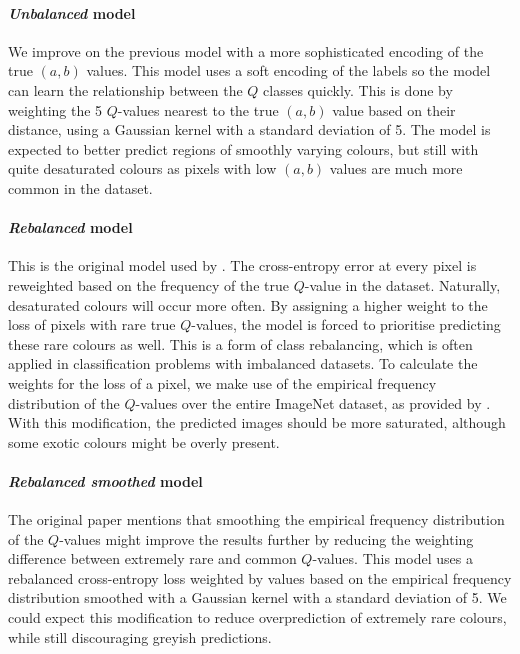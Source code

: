 \documentclass{article}
\begin{document}
\paragraph{\textit{Unbalanced} model}
We improve on the previous model with a more sophisticated encoding of the true $(a, b)$ values.
This model uses a soft encoding of the labels so the model can learn the relationship between the $Q$ classes quickly.
This is done by weighting the 5 $Q$-values nearest to the true $(a, b)$ value based on their distance, using
a Gaussian kernel with a standard deviation of 5.
The model is expected to better predict regions of smoothly varying colours, but still with quite desaturated colours
as pixels with low $(a, b)$ values are much more common in the dataset.
\paragraph{\textit{Rebalanced} model}
This is the original model used by \cite{colourful}.
The cross-entropy error at every pixel is reweighted based on the frequency of the true $Q$-value in the dataset.
Naturally, desaturated colours will occur more often. By assigning a higher weight to the loss of pixels with rare true $Q$-values,
the model is forced to prioritise predicting these rare colours as well.
This is a form of class rebalancing, which is often applied in classification problems with imbalanced datasets.
To calculate the weights for the loss of a pixel, we make use of the empirical frequency distribution of the $Q$-values
over the entire ImageNet dataset, as provided by \cite{colourful}.
With this modification, the predicted images should be more saturated, although some exotic colours might be overly present.
\paragraph{\textit{Rebalanced smoothed} model}
The original paper mentions that smoothing the empirical frequency distribution of the $Q$-values might improve the results further
by reducing the weighting difference between extremely rare and common $Q$-values. This model uses a rebalanced cross-entropy loss
weighted by values based on the empirical frequency distribution smoothed with a Gaussian kernel with a standard deviation of 5.
We could expect this modification to reduce overprediction of extremely rare colours, while still discouraging greyish predictions.
\end{document}
